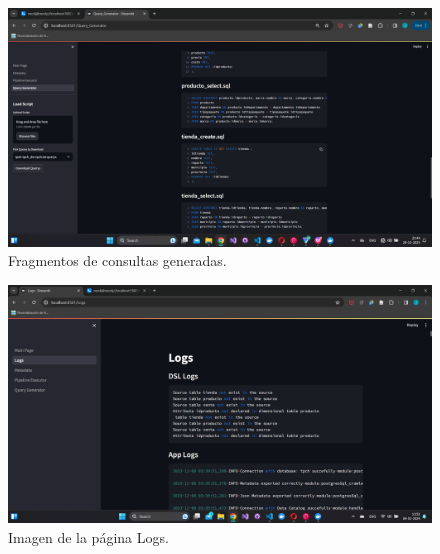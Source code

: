 \begin{annexes}
    \begin{figure}
        \centering
        \includegraphics[scale=0.4]{Graphics/generatedquerys1.png}
        \caption{Fragmentos de consultas generadas.}
        \label{fig:qfragment}
    \end{figure}

    \begin{figure}
        \centering
        \includegraphics[scale=0.4]{Graphics/logs.png}
        \caption{Imagen de la p\'agina Logs.}
        \label{fig:logs}
    \end{figure}
\end{annexes}